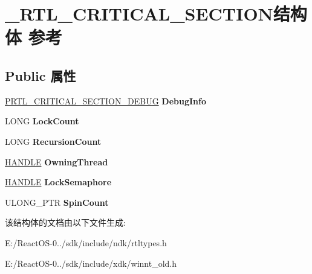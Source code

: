 \hypertarget{struct___r_t_l___c_r_i_t_i_c_a_l___s_e_c_t_i_o_n}{}\section{\+\_\+\+R\+T\+L\+\_\+\+C\+R\+I\+T\+I\+C\+A\+L\+\_\+\+S\+E\+C\+T\+I\+O\+N结构体 参考}
\label{struct___r_t_l___c_r_i_t_i_c_a_l___s_e_c_t_i_o_n}
\subsection*{Public 属性}
\begin{DoxyCompactItemize}
\item 
\mbox{\label{struct___r_t_l___c_r_i_t_i_c_a_l___s_e_c_t_i_o_n_aed66a4184184160a7700075cd2e0db52}} 
\hyperlink{struct___r_t_l___c_r_i_t_i_c_a_l___s_e_c_t_i_o_n___d_e_b_u_g}{P\+R\+T\+L\+\_\+\+C\+R\+I\+T\+I\+C\+A\+L\+\_\+\+S\+E\+C\+T\+I\+O\+N\+\_\+\+D\+E\+B\+UG} {\bfseries Debug\+Info}
\item 
\mbox{\label{struct___r_t_l___c_r_i_t_i_c_a_l___s_e_c_t_i_o_n_a67a7c1bad6e599d66d3e5beedb9e6969}} 
L\+O\+NG {\bfseries Lock\+Count}
\item 
\mbox{\label{struct___r_t_l___c_r_i_t_i_c_a_l___s_e_c_t_i_o_n_a640e28b1f5a7b9993853a102b25d2260}} 
L\+O\+NG {\bfseries Recursion\+Count}
\item 
\mbox{\label{struct___r_t_l___c_r_i_t_i_c_a_l___s_e_c_t_i_o_n_a0885f84f7bb81fdc4167f5da818c8a47}} 
\hyperlink{interfacevoid}{H\+A\+N\+D\+LE} {\bfseries Owning\+Thread}
\item 
\mbox{\label{struct___r_t_l___c_r_i_t_i_c_a_l___s_e_c_t_i_o_n_aee8933ac4e1684c76abb32fa26328d9b}} 
\hyperlink{interfacevoid}{H\+A\+N\+D\+LE} {\bfseries Lock\+Semaphore}
\item 
\mbox{\label{struct___r_t_l___c_r_i_t_i_c_a_l___s_e_c_t_i_o_n_a2a1257a29c0b86571f28d8d785379b5e}} 
U\+L\+O\+N\+G\+\_\+\+P\+TR {\bfseries Spin\+Count}
\end{DoxyCompactItemize}


该结构体的文档由以下文件生成\+:\begin{DoxyCompactItemize}
\item 
E\+:/\+React\+O\+S-\/0../sdk/include/ndk/rtltypes.\+h\item 
E\+:/\+React\+O\+S-\/0../sdk/include/xdk/winnt\+\_\+old.\+h\end{DoxyCompactItemize}
